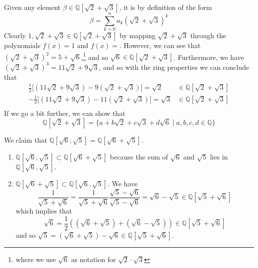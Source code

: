   \begin{example}
    Given any element $\beta \in \mathbb{Q}[\sqrt{2} + \sqrt{3}]$, it is by definition of the form 
    \begin{equation}
      \beta = \sum_{k=0}^n a_k (\sqrt{2} + \sqrt{3})^k 
    \end{equation} 
    Clearly $1, \sqrt{2} + \sqrt{3} \in \mathbb{Q}[\sqrt{2} + \sqrt{3}]$ by mapping $\sqrt{2} + \sqrt{3}$ through the polynomials $f(x) = 1$ and $f(x) = $. However, we can see that $(\sqrt{2} + \sqrt{3})^2 = 5 + \sqrt{6}$,\footnote{where we use $\sqrt{6}$ as notation for $\sqrt{2} \cdot \sqrt{3}$} and so $\sqrt{6} \in \mathbb{Q}[\sqrt{2} + \sqrt{3}]$. Furthermore, we have $(\sqrt{2} + \sqrt{3})^3 = 11 \sqrt{2} + 9 \sqrt{3}$, and so with the ring properties we can conclude that 
    \begin{align}
      \frac{1}{2} \big[ (11 \sqrt{2} + 9 \sqrt{3}) - 9 (\sqrt{2} + \sqrt{3})\big] = \sqrt{2} & \in \mathbb{Q}[\sqrt{2} + \sqrt{3}] \\
      -\frac{1}{2} \big[ (11 \sqrt{2} + 9 \sqrt{3}) - 11 (\sqrt{2} + \sqrt{3})\big] = \sqrt{3} & \in \mathbb{Q}[\sqrt{2} + \sqrt{3}] \\
    \end{align} 
    If we go a bit further, we can show that 
    \begin{equation}
      \mathbb{Q}[\sqrt{2} + \sqrt{3}] = \{a + b \sqrt{2} + c \sqrt{3} + d\sqrt{6} \mid a, b, c, d \in \mathbb{Q} \}
    \end{equation}
  \end{example}

  \begin{example}
    We claim that $\mathbb{Q}[\sqrt{6}, \sqrt{5}] = \mathbb{Q}[\sqrt{6} + \sqrt{5}]$. 
    \begin{enumerate}
      \item $\mathbb{Q}[\sqrt{6}, \sqrt{5}] \subset \mathbb{Q}[\sqrt{6} + \sqrt{5}]$ because the sum of $\sqrt{6}$ and $\sqrt{5}$ lies in $\mathbb{Q}[\sqrt{6}, \sqrt{5}]$. 
      \item $\mathbb{Q}[\sqrt{6} + \sqrt{5}] \subset \mathbb{Q}[\sqrt{6}, \sqrt{5}]$. We have 
        \begin{equation}
          \frac{1}{\sqrt{5} + \sqrt{6}} = \frac{1}{\sqrt{5} + \sqrt{6}} \frac{\sqrt{5} - \sqrt{6}}{\sqrt{5} - \sqrt{6}} = \sqrt{6} - \sqrt{5} \in \mathbb{Q}[\sqrt{5} + \sqrt{6}] 
        \end{equation}
        which implies that 
        \begin{equation}
          \sqrt{6} = \frac{1}{2} ((\sqrt{6} + \sqrt{5}) + (\sqrt{6} - \sqrt{5})) \in \mathbb{Q}[\sqrt{5} + \sqrt{6}] 
        \end{equation}
        and so $\sqrt{5} = (\sqrt{6} + \sqrt{5}) - \sqrt{6} \in \mathbb{Q}[\sqrt{5} + \sqrt{6}]$. 
    \end{enumerate}
  \end{example}

